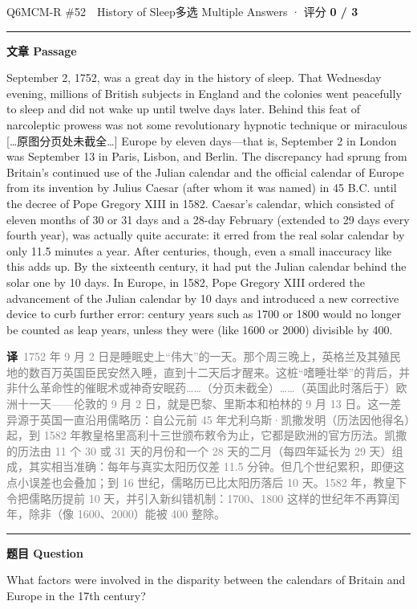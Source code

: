 \documentclass[11pt]{article}
\newcommand{\ptesub}[1]{%
  \par\needspace{2\baselineskip}\smallskip
  {\color{cAccent}\rule[-0.2ex]{3pt}{1.05em}}\hspace{6pt}%
  {\bfseries\color{cHead}#1}\par\nopagebreak\smallskip}
\newcommand{\zh}[1]{{\footnotesize\textcolor{cNote}{\textbf{译}}\ \textcolor{gray}{#1}}}
\begin{document}
\begin{qblock}{Q6\quad MCM-R \#52\ \ History of Sleep}{多选 Multiple Answers · 评分 \textcolor{cAccent}{\bfseries 0 / 3}}
\ptesub{文章 Passage}
\begin{promptbox}
September 2, 1752, was a great day in the history of sleep. That Wednesday evening, millions of British subjects in England and the colonies went peacefully to sleep and did not wake up until twelve days later. Behind this feat of narcoleptic prowess was not some revolutionary hypnotic technique or miraculous {\footnotesize\color{cWrong}[…原图分页处未截全…]} Europe by eleven days---that is, September 2 in London was September 13 in Paris, Lisbon, and Berlin. The discrepancy had sprung from Britain's continued use of the Julian calendar and the official calendar of Europe from its invention by Julius Caesar (after whom it was named) in 45 B.C. until the decree of Pope Gregory XIII in 1582. Caesar's calendar, which consisted of eleven months of 30 or 31 days and a 28-day February (extended to 29 days every fourth year), was actually quite accurate: it erred from the real solar calendar by only 11.5 minutes a year. After centuries, though, even a small inaccuracy like this adds up. By the sixteenth century, it had put the Julian calendar behind the solar one by 10 days. In Europe, in 1582, Pope Gregory XIII ordered the advancement of the Julian calendar by 10 days and introduced a new corrective device to curb further error: century years such as 1700 or 1800 would no longer be counted as leap years, unless they were (like 1600 or 2000) divisible by 400.
\end{promptbox}
\zh{1752 年 9 月 2 日是睡眠史上“伟大”的一天。那个周三晚上，英格兰及其殖民地的数百万英国臣民安然入睡，直到十二天后才醒来。这桩“嗜睡壮举”的背后，并非什么革命性的催眠术或神奇安眠药……（分页未截全）……（英国此时落后于）欧洲十一天——伦敦的 9 月 2 日，就是巴黎、里斯本和柏林的 9 月 13 日。这一差异源于英国一直沿用儒略历：自公元前 45 年尤利乌斯·凯撒发明（历法因他得名）起，到 1582 年教皇格里高利十三世颁布敕令为止，它都是欧洲的官方历法。凯撒的历法由 11 个 30 或 31 天的月份和一个 28 天的二月（每四年延长为 29 天）组成，其实相当准确：每年与真实太阳历仅差 11.5 分钟。但几个世纪累积，即便这点小误差也会叠加；到 16 世纪，儒略历已比太阳历落后 10 天。1582 年，教皇下令把儒略历提前 10 天，并引入新纠错机制：1700、1800 这样的世纪年不再算闰年，除非（像 1600、2000）能被 400 整除。}
\ptesub{题目 Question}
\begin{notebox}\small What factors were involved in the disparity between the calendars of Britain and Europe in the 17th century?\end{notebox}

\end{qblock}
\end{document}
